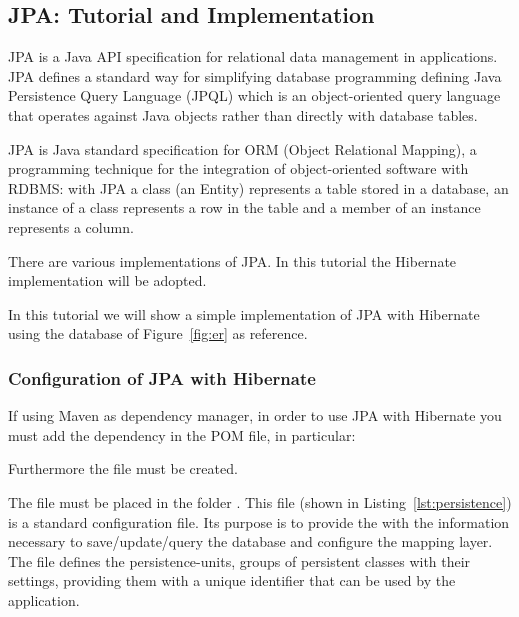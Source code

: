 \subsection{JPA: Tutorial and Implementation}

JPA is a Java API specification for relational data management in applications.
JPA defines a standard way for simplifying database programming defining Java
Persistence Query Language (JPQL) which is an object-oriented query language
that operates against Java objects rather than directly with database tables.

JPA is Java standard specification for ORM (Object Relational Mapping), a
programming technique for the integration of object-oriented software with
RDBMS: with JPA a class (an Entity) represents a table stored in a database, an
instance of a class represents a row in the table and a member of an instance
represents a column.

There are various implementations of JPA\@. In this tutorial the Hibernate
implementation will be adopted.

In this tutorial we will show a simple implementation of JPA with Hibernate
using the database of Figure~\ref{fig:er} as reference.

\subsubsection{Configuration of JPA with Hibernate}

If using Maven as dependency manager, in order to use JPA with Hibernate you
must add the dependency in the POM file, in particular:



Furthermore the file  must be created.

The  file must be placed in the folder
. This file (shown in
Listing~\ref{lst:persistence}) is a standard configuration file. Its purpose is
to provide the  with the information necessary to
save/update/query the database and configure the mapping layer. The file defines
the persistence-units, groups of persistent classes with their settings,
providing them with a unique identifier that can be used by the application.



